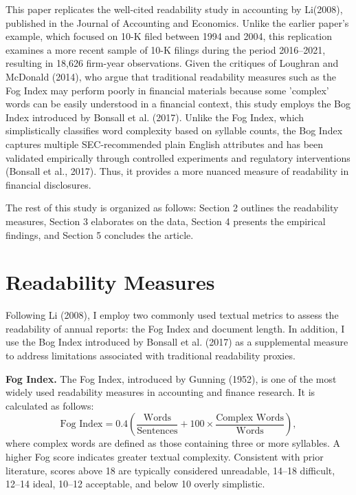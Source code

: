 \documentclass[a4paper]{article}
\begin{document}
This paper replicates the well-cited readability study in accounting by Li(2008)\cite{li2008annual}, published in the Journal of Accounting and Economics. Unlike the earlier paper’s example, which focused on 10-K filed between 1994 and 2004, this replication examines a more recent sample of 10-K filings during the period 2016–2021, resulting in 18,626 firm-year observations. Given the critiques of Loughran and McDonald (2014)\cite{loughran2014measuring}, who argue that traditional readability measures such as the Fog Index may perform poorly in financial materials because some 'complex' words can be easily understood in a financial context, this study employs the Bog Index introduced by Bonsall et al. (2017)\cite{bonsall2017plain}. Unlike the Fog Index, which simplistically classifies word complexity based on syllable counts, the Bog Index captures multiple SEC-recommended plain English attributes and has been validated empirically through controlled experiments and regulatory interventions (Bonsall et al., 2017). Thus, it provides a more nuanced measure of readability in financial disclosures.\par

The rest of this study is organized as follows: Section 2 outlines the readability measures, Section 3 elaborates on the data, Section 4 presents the empirical findings, and Section 5 concludes the article.


\section{Readability Measures}

Following Li (2008), I employ two commonly used textual metrics to assess the readability of annual reports: the Fog Index and document length. In addition, I use the Bog Index introduced by Bonsall et al. (2017) as a supplemental measure to address limitations associated with traditional readability proxies.

\textbf{Fog Index.} The Fog Index, introduced by Gunning (1952), is one of the most widely used readability measures in accounting and finance research. It is calculated as follows:
\[
\text{Fog Index} = 0.4 \left( \frac{\text{Words}}{\text{Sentences}} + 100 \times \frac{\text{Complex Words}}{\text{Words}} \right),
\]
where complex words are defined as those containing three or more syllables. A higher Fog score indicates greater textual complexity. Consistent with prior literature, scores above 18 are typically considered unreadable, 14–18 difficult, 12–14 ideal, 10–12 acceptable, and below 10 overly simplistic.
\end{document}
